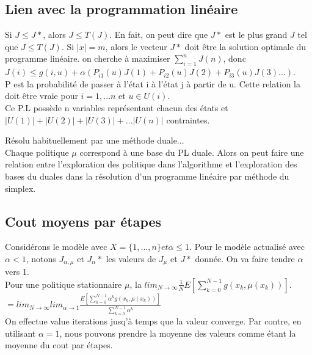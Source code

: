 \documentclass[oneside]{book}
\begin{document}
\subsection{Lien avec la programmation linéaire}
Si $J \leq J*$, alors $J \leq T(J)$. En fait, on peut dire que $J*$ est le plus grand $J$ tel que $J \leq T(J)$. Si $|x| = m$, alors le vecteur $J*$ doit être la solution optimale du programme linéaire. on cherche à maximiser $\sum\limits_{i = 1}^nJ(n)$, donc $J(i) \leq g(i, u) + \alpha(P_{i1}(u)J(1) +P_{i2}(u)J(2) + P_{i3}(u)J(3)...) $.\\

P est la probabilité de passer à l'état i à l'état j à partir de u. Cette relation la doit être vraie pour $i=1,...n $ et $u \in U(i)$.\\

Ce P.L possède n variables représentant chacun des états et $|U(1)| + |U(2)| + |U(3)| +... |U(n)|$ contraintes. 

Résolu habituellement par une méthode duale...\\

Chaque politique $\mu$ correspond à une base du PL duale. Alors on peut faire une relation entre l'exploration des politique dans l'algorithme et l'exploration des bases du duales dans la résolution d'un programme linéaire par méthode du simplex.\\

\subsection{Cout moyens par étapes}
Considérons le modèle avec $X = \{1,...,n\} et \alpha \leq 1$. Pour le modèle actualisé avec $\alpha < 1$, notons $J_{\alpha,\mu}$ et $J_{\alpha}*$ les valeurs de $J_{\mu}$ et $J*$ donnée. On va faire tendre $\alpha$ vers 1.\\

Pour une politique stationnaire $\mu$, la $lim_{N \rightarrow \infty}\frac{1}{N}E[\sum\limits_{k = 0}^{N-1}g(x_k, \mu(x_k))]$. \\


$= lim_{N \rightarrow \infty} lim_{\alpha \rightarrow 1} \frac{E[\sum\limits_{k=0}^{N-1}\alpha^kg(x_k, \mu(x_k))]}{\sum\limits_{k=0}^{N-1}\alpha^k}$\\

On effectue value iterations jusq'à temps que la valeur converge. Par contre, en utilisant $\alpha = 1$, nous pouvons prendre la moyenne des valeurs comme étant la moyenne du cout par étapes.\\
\end{document}
